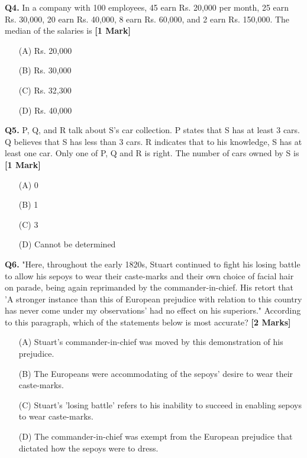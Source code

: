 \documentclass[11pt]{article}
\newcommand{\questiona}[2]{
    \noindent\textbf{Q#2.} #1 \hfill \textbf{[1 Mark]}
}
\newcommand{\questionb}[2]{
    \noindent\textbf{Q#2.} #1 \hfill \textbf{[2 Marks]}
}
\begin{document}
\questiona{In a company with 100 employees, 45 earn Rs. 20,000 per month, 25 earn Rs. 30,000, 20 earn Rs. 40,000, 8 earn Rs. 60,000, and 2 earn Rs. 150,000. The median of the salaries is}{4}
\begin{enumerate}
    \item[(A)] Rs. 20,000
    \item[(B)] Rs. 30,000
    \item[(C)] Rs. 32,300
    \item[(D)] Rs. 40,000
\end{enumerate}
\vspace{0.5cm}

\questiona{P, Q, and R talk about S's car collection. P states that S has at least 3 cars. Q believes that S has less than 3 cars. R indicates that to his knowledge, S has at least one car. Only one of P, Q and R is right. The number of cars owned by S is}{5}
\begin{enumerate}
    \item[(A)] 0
    \item[(B)] 1
    \item[(C)] 3
    \item[(D)] Cannot be determined
\end{enumerate}
\vspace{0.5cm}

\questionb{"Here, throughout the early 1820s, Stuart continued to fight his losing battle to allow his sepoys to wear their caste-marks and their own choice of facial hair on parade, being again reprimanded by the commander-in-chief. His retort that 'A stronger instance than this of European prejudice with relation to this country has never come under my observations' had no effect on his superiors."
According to this paragraph, which of the statements below is most accurate?}{6}
\begin{enumerate}
    \item[(A)] Stuart's commander-in-chief was moved by this demonstration of his prejudice.
    \item[(B)] The Europeans were accommodating of the sepoys' desire to wear their caste-marks.
    \item[(C)] Stuart's 'losing battle' refers to his inability to succeed in enabling sepoys to wear caste-marks.
    \item[(D)] The commander-in-chief was exempt from the European prejudice that dictated how the sepoys were to dress.
\end{enumerate}
\vspace{0.5cm}
\end{document}
